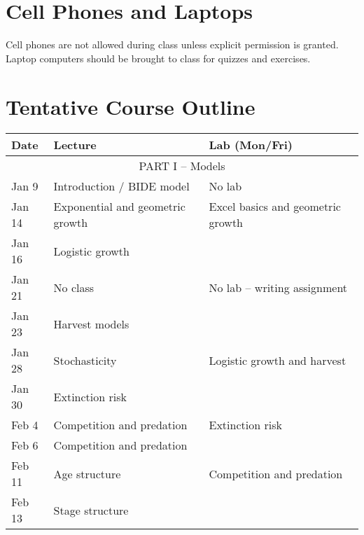 \documentclass[11pt]{article}
\begin{document}
\vspace{-5mm}
\section*{Cell Phones and Laptops}
\vspace{-5mm}
Cell phones are not allowed during class unless explicit permission is
granted. Laptop computers should be brought to class for quizzes and
exercises.  



\section*{Tentative Course Outline}
\vspace{-5mm}
\large

\begin{center}
\begin{tabular}[c]{lll}
\hline \hline
{\bf Date} & {\bf Lecture}                      & {\bf Lab (Mon/Fri)}               \\
\hline
           \multicolumn{3}{c}{PART I -- Models}                                     \\
\hline
Jan 9      & Introduction / BIDE model          & No lab                            \\ 
\hline
Jan 14     & Exponential and geometric growth   & Excel basics and geometric growth \\ 
Jan 16     & Logistic growth                    &                                   \\
\hline
Jan 21     & No class                           & No lab -- writing assignment      \\
Jan 23     & Harvest models                     &                                   \\
\hline
Jan 28     & Stochasticity                      & Logistic growth and harvest       \\
Jan 30     & Extinction risk                    &                                   \\
\hline
Feb 4      & Competition and predation          & Extinction risk                   \\
Feb 6      & Competition and predation          &                                   \\
\hline
Feb 11     & Age structure                      & Competition and predation         \\
Feb 13     & Stage structure                    &                                   \\

\end{tabular}
\end{center}
\end{document}
